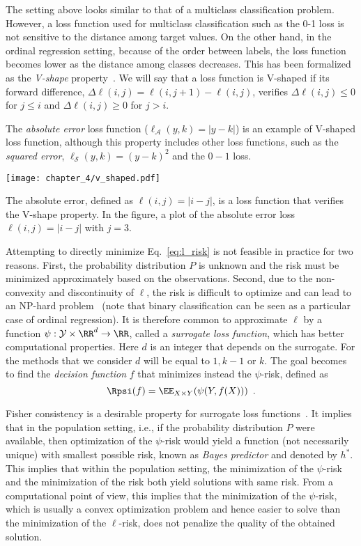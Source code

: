 The setting above looks similar to that of a multiclass classification problem. However, a loss function used for multiclass classification such as the 0-1 loss is not sensitive to the distance among target values. On the other hand, in the ordinal regression setting, because of the order between labels, the loss function becomes lower as the distance among classes decreases. This has been formalized as the \emph{V-shape} property~\citep{Li2007}. We will say that a loss function is V-shaped if its forward difference, $\Delta\ell(i, j) = \ell(i, j+1) - \ell(i, j)$, verifies $\Delta\ell(i, j) \leq 0$ for $j \leq i$ and $\Delta\ell(i, j) \geq 0$ for $j > i$.

The \emph{absolute error} loss function ($\ell_{\mathcal{A}}(y, k) = |y-k|$) is an example of V-shaped loss function, although this property includes other loss functions, such as the \emph{squared error}, $\ell_{\mathcal{S}}(y, k) = (y-k)^2$ and the $0-1$ loss.

\begin{marginfigure}
\texttt{[image: chapter\_4/v\_shaped.pdf]}
\caption{
     The absolute error, defined as $\ell(i, j) = |i - j|$, is a loss function that verifies the V-shape property. In the figure, a plot of the absolute error loss $\ell(i, j) = |i - j|$ with $j=3$.
}
\end{marginfigure}


Attempting to directly minimize Eq.~\eqref{eq:l_risk} is not feasible in practice for two reasons. First, the probability distribution $P$ is unknown and the risk must be minimized approximately based on the observations. Second, due to the non-convexity and discontinuity of $\ell$, the risk is difficult to optimize and can lead to an NP-hard problem~\citep{feldman2012agnostic,ben2003difficulty} (note that binary classification can be seen as a particular case of ordinal regression). It is therefore common to approximate $\ell$ by a function $\psi: \mathcal{Y} \times \RR^d \to \RR$, called a \emph{surrogate loss function}, which has better computational properties. Here $d$ is an integer that depends on the surrogate. For the methods that we consider $d$ will be equal to $1, k-1$ or $k$. The goal becomes to find the \emph{decision function} $f$ that minimizes instead the $\psi$-risk, defined as
\begin{equation}
\Rpsi(f) = \EE_{X \times Y}(\psi(Y, f(X))) \enspace.
\end{equation}

Fisher consistency is a desirable property for surrogate loss functions~\citep{Lin2004}. It implies that in the population setting, i.e., if the probability distribution $P$ were available, then optimization of the $\psi$-risk would yield a function (not necessarily unique) with smallest possible risk, known as \emph{Bayes predictor} and denoted by $h^*$. This implies that within the population setting, the minimization of the $\psi$-risk and the minimization of the risk both yield solutions with same risk. From a computational point of view, this implies that the minimization of the $\psi$-risk, which is usually a convex optimization problem and hence easier to solve than the minimization of the $\ell$-risk, does not penalize the quality of the obtained solution.


